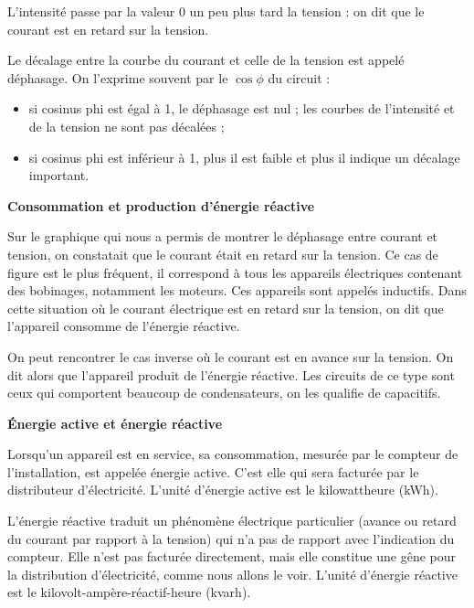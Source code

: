L’intensité passe par la valeur 0 un peu plus tard la tension : on dit que le courant est en retard sur la tension.
\vspace{0.3cm}

Le décalage entre la courbe du courant et celle de la tension est appelé déphasage. On l’exprime souvent par le  $ \cos \phi $ du circuit :

\begin{itemize}
\item si cosinus phi est égal à 1, le déphasage est nul ; les courbes de l’intensité et de la tension ne sont pas décalées ;
\item si cosinus phi est inférieur à 1, plus il est faible et plus il indique un décalage important.

\end{itemize}

\newpage
\vspace{0.3cm}
\textbf{Consommation et production d'énergie réactive}
\vspace{0.3cm}

Sur le graphique qui nous a permis de montrer le déphasage entre courant et tension, on constatait que le courant était en retard sur la tension. Ce cas de figure est le plus fréquent, il correspond à tous les appareils électriques contenant des bobinages, notamment les moteurs. Ces appareils sont appelés inductifs. Dans cette situation où le courant électrique est en retard sur la tension, on dit que l’appareil consomme de l’énergie réactive.
\vspace{0.3cm}

On peut rencontrer le cas inverse où le courant est en avance sur la tension. On dit alors que l’appareil produit de l’énergie réactive. Les circuits de ce type sont ceux qui comportent beaucoup de condensateurs, on les qualifie de capacitifs.


\vspace{0.3cm}
\textbf{Énergie active et énergie réactive}
\vspace{0.3cm}

Lorsqu’un appareil est en service, sa consommation, mesurée par le compteur de l’installation, est appelée énergie active. C’est elle qui sera facturée par le distributeur d’électricité. L’unité d’énergie active est le kilowattheure (kWh).
\vspace{0.3cm}

L’énergie réactive traduit un phénomène électrique particulier (avance ou retard du courant par rapport à la tension) qui n’a pas de rapport avec l’indication du compteur. Elle n’est pas facturée directement, mais elle constitue une gêne pour la distribution d’électricité, comme nous allons le voir. L’unité d’énergie réactive est le kilovolt-ampère-réactif-heure (kvarh).


